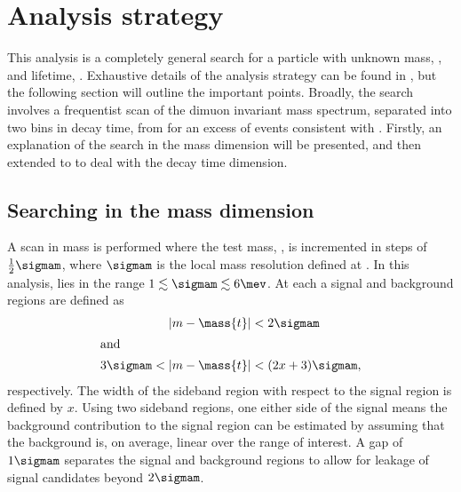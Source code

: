 \section{Analysis strategy}
\label{sec:db:strategy}

This analysis is a completely general search for a particle with unknown mass, \mass\db, and
lifetime, \lifetime\db.
Exhaustive details of the analysis strategy can be found in , but the
following section will outline the important points.
Broadly, the search involves a frequentist scan of the dimuon invariant mass spectrum,
separated into two bins in decay time, from
\btokstrmumu for an excess of events consistent with \dbtomumu.
Firstly, an explanation of the search in the mass dimension will be presented, and then extended to
to deal with the decay time dimension.


\subsection{Searching in the mass dimension}
A scan in mass is performed where the test mass, , is incremented in steps of
$\tfrac12\sigmam$, where $\sigmam$ is the local mass resolution defined at .
In this analysis, \sigmam lies in the range $1\lesssim\sigmam\lesssim6\mev$.
At each  a signal and background regions are defined as
\begin{align}
  |m-\mass{t}|&<2\sigmam \\
  \intertext{and}
  3\sigmam<|m-\mass{t}|&<(2x+3)\sigmam,
\end{align}
respectively.
The width of the sideband region with respect to the signal region is defined by $x$.
Using two sideband regions, one either side of the signal means the background contribution to the
signal region can be estimated by assuming that the background is, on average, linear over the
range of interest.
A gap of $1\sigmam$ separates the signal and background regions to allow for leakage of signal
candidates beyond $2\sigmam$.

